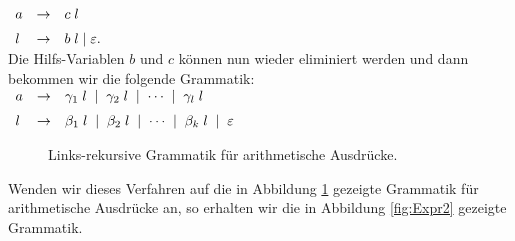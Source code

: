 $
\begin{array}[t]{lcl}
a & \rightarrow & c\;l                   \\[0.2cm]
l & \rightarrow & b\;l \mid \varepsilon.  
\end{array}
$
\\[0.2cm]
Die Hilfs-Variablen $b$ und $c$ k\"onnen nun wieder eliminiert werden und dann bekommen wir die folgende
Grammatik: 
\\[0.2cm]
\hspace*{1.3cm}
$
\begin{array}[t]{lcl}
a & \rightarrow & \gamma_1\;l \;\mid\; \gamma_2\;l \;\mid\; \cdots \;\mid\; \gamma_l\;l  \\[0.2cm]
l & \rightarrow & \beta_1 \;l \;\mid\; \beta_2 \;l \;\mid\; \cdots \;\mid\; \beta_k \;l \;\mid\; \varepsilon
\end{array}
$
\begin{figure}[htbp]
  \begin{center}    
  \end{center}
  \caption{Links-rekursive Grammatik f\"ur arithmetische Ausdr\"ucke.}
  \label{fig:Expr}
\end{figure}
\vspace*{0.3cm}

\noindent
Wenden wir dieses Verfahren auf die in Abbildung \ref{fig:Expr} gezeigte Grammatik f\"ur arithmetische
Ausdr\"ucke an, so erhalten wir die in Abbildung \ref{fig:Expr2} gezeigte Grammatik.

